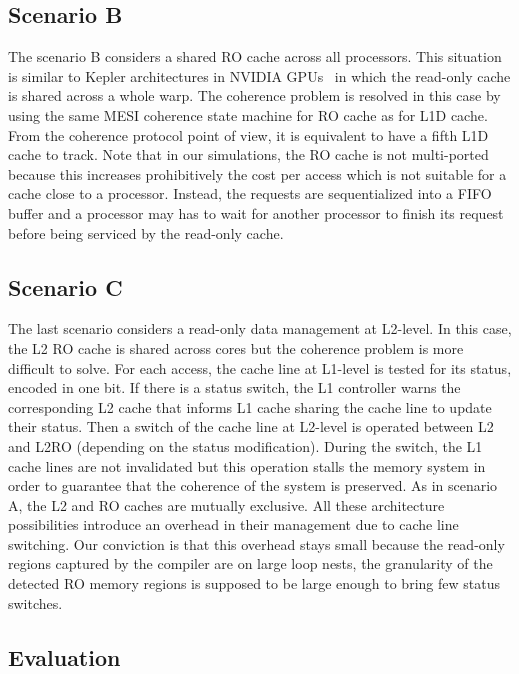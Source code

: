 \documentclass[sigconf]{acmart}
\begin{document}
\subsection{Scenario B}

The scenario B considers a shared RO cache across all processors. This situation is similar to Kepler architectures in NVIDIA GPUs~\cite{NVIDIA:2007} in which the read-only cache is shared across a whole warp. The coherence problem is resolved in this case by using the same MESI coherence state machine for RO cache as for L1D cache. From the coherence protocol point of view, it is equivalent to have a fifth L1D cache to track. Note that in our simulations, the RO cache is not multi-ported because this increases prohibitively the cost per access which is not suitable for a cache close to a processor. Instead, the requests are sequentialized into a FIFO buffer and a processor may has to wait for another processor to finish its request before being serviced by the read-only cache.


\subsection{Scenario C}
The last scenario considers a read-only data management at L2-level. In this case, the L2 RO cache is shared across cores but the coherence problem is more difficult to solve. For each access, the cache line at L1-level is tested for its status, encoded in one bit. If there is a status switch, the L1 controller warns the corresponding L2 cache that informs L1 cache sharing the cache line to update their status. Then a switch of the cache line at L2-level is operated between L2 and L2RO (depending on the status modification). During the switch, the L1 cache lines are not invalidated but this operation stalls the memory system in order to guarantee that the coherence of the system is preserved. As in scenario A, the L2 and RO caches are mutually exclusive. All these architecture possibilities introduce an overhead in their management due to cache line switching. Our conviction is that this overhead stays small because the read-only regions captured by the compiler are on large loop nests, the granularity of the detected RO memory regions is supposed to be large enough to bring few status switches.

\subsection{Evaluation}
\end{document}
